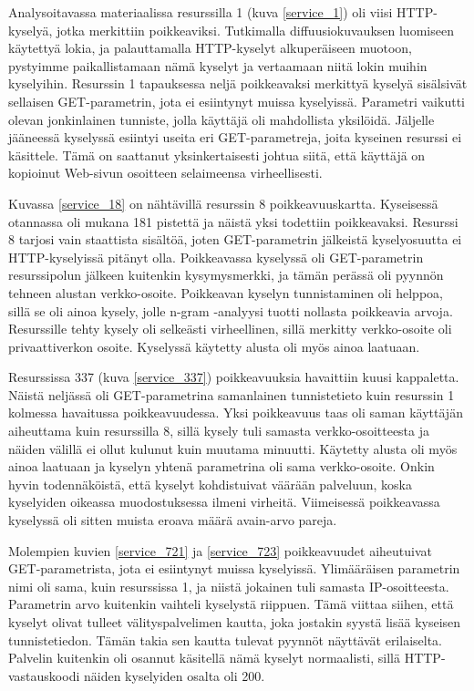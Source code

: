 Analysoitavassa materiaalissa resurssilla 1 (kuva \ref{service_1}) oli
viisi HTTP-kyselyä, jotka merkittiin poikkeaviksi. Tutkimalla
diffuusiokuvauksen luomiseen käytettyä lokia, ja palauttamalla
HTTP-kyselyt alkuperäiseen muotoon, pystyimme paikallistamaan nämä
kyselyt ja vertaamaan niitä lokin muihin kyselyihin. Resurssin 1
tapauksessa neljä poikkeavaksi merkittyä kyselyä sisälsivät sellaisen
GET-parametrin, jota ei esiintynyt muissa kyselyissä. Parametri
vaikutti olevan jonkinlainen tunniste, jolla käyttäjä oli mahdollista
yksilöidä. Jäljelle jääneessä kyselyssä esiintyi useita eri
GET-parametreja, joita kyseinen resurssi ei käsittele. Tämä on
saattanut yksinkertaisesti johtua siitä, että käyttäjä on kopioinut
Web-sivun osoitteen selaimeensa virheellisesti.

Kuvassa \ref{service_18} on nähtävillä resurssin 8 poikkeavuuskartta. Kyseisessä otannassa oli mukana 181 pistettä ja näistä yksi todettiin poikkeavaksi.
Resurssi 8 tarjosi vain staattista sisältöä, joten GET-parametrin jälkeistä kyselyosuutta ei HTTP-kyselyissä pitänyt olla. Poikkeavassa kyselyssä oli
GET-parametrin resurssipolun jälkeen kuitenkin kysymysmerkki, ja tämän perässä oli pyynnön tehneen alustan verkko-osoite. Poikkeavan kyselyn tunnistaminen
oli helppoa, sillä se oli ainoa kysely, jolle n-gram -analyysi tuotti
nollasta poikkeavia arvoja. Resurssille tehty kysely oli selkeästi virheellinen, sillä merkitty verkko-osoite 
oli privaattiverkon osoite. Kyselyssä käytetty alusta oli myös ainoa laatuaan.

Resurssissa 337 (kuva \ref{service_337}) poikkeavuuksia havaittiin kuusi kappaletta. Näistä neljässä oli GET-parametrina samanlainen tunnistetieto
kuin resurssin 1 kolmessa havaitussa poikkeavuudessa. Yksi poikkeavuus taas oli saman käyttäjän aiheuttama kuin resurssilla 8, sillä kysely tuli samasta
verkko-osoitteesta ja näiden välillä ei ollut kulunut kuin muutama
minuutti. Käytetty alusta oli myös ainoa laatuaan ja kyselyn yhtenä parametrina oli 
sama verkko-osoite. Onkin hyvin todennäköistä, että kyselyt
kohdistuivat väärään palveluun, koska kyselyiden oikeassa muodostuksessa ilmeni
virheitä. Viimeisessä poikkeavassa kyselyssä oli sitten muista eroava määrä avain-arvo pareja.

Molempien kuvien \ref{service_721} ja \ref{service_723} poikkeavuudet
aiheutuivat GET-parametrista, jota ei esiintynyt muissa
kyselyissä. Ylimääräisen parametrin nimi oli sama, kuin resurssissa 1,
ja niistä jokainen tuli samasta IP-osoitteesta. Parametrin arvo
kuitenkin vaihteli kyselystä riippuen. Tämä viittaa siihen, että
kyselyt olivat tulleet välityspalvelimen kautta, joka jostakin syystä
lisää kyseisen tunnistetiedon. Tämän takia sen kautta tulevat pyynnöt
näyttävät erilaiselta. Palvelin kuitenkin oli osannut käsitellä nämä
kyselyt normaalisti, sillä HTTP-\-vastauskoodi näiden kyselyiden
osalta oli 200.

